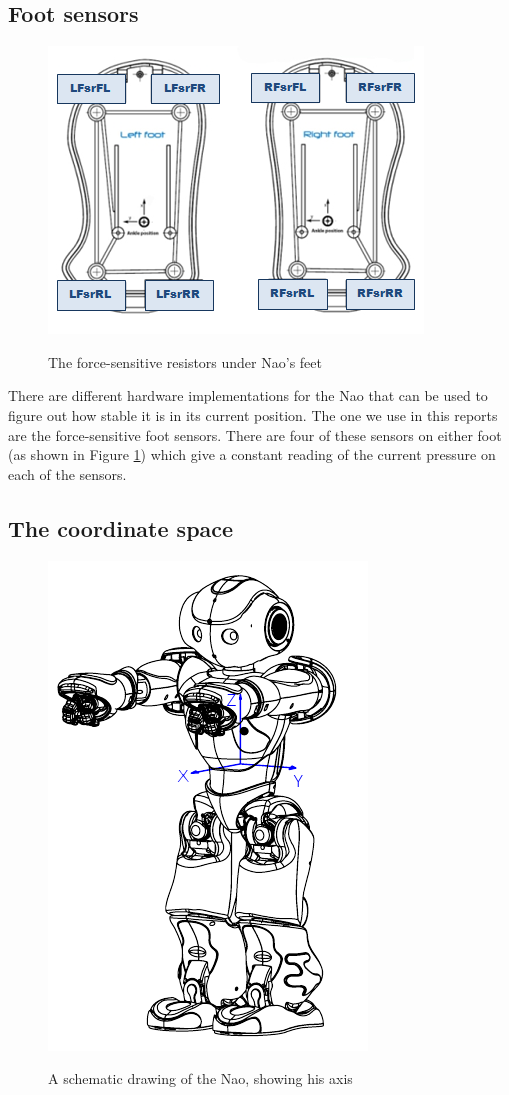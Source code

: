 \documentclass[a4paper]{article}
\begin{document}
\subsection{Foot sensors} 
\begin{figure}[htb]
	\centering
	\includegraphics[scale=0.75]{pics/naosfeet.jpg}
	\label{fig:fsr_plot2}
	\caption{The force-sensitive resistors under Nao's feet}
\end{figure}
There are different hardware implementations for the
Nao that can be used to figure out how stable it is in its current position. The one we use in this
reports are the force-sensitive foot sensors. There are four of these sensors on either foot
(as shown in Figure \ref{fig:fsr_plot2})
which give a constant reading of the current pressure on each of the sensors.

\subsection{The coordinate space}
\begin{figure}[htb]
	\centering
	\includegraphics[scale=0.6]{pics/hardware_inertialunit.png}
	\label{fig:hardware}
	\caption{A schematic drawing of the Nao, showing his axis}
\end{figure}
\end{document}
